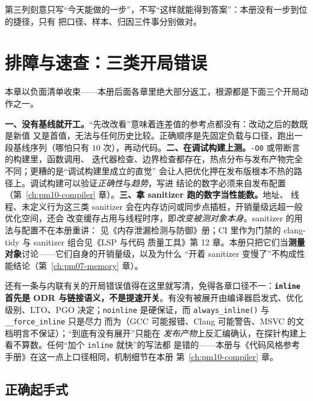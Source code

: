 \documentclass[12pt,a4paper,fontset=fandol]{ctexbook}
\newcommand{\Fn}[1]{\texttt{#1()}}
\newcommand{\Tp}[1]{\texttt{#1}}
\begin{document}
第三列刻意只写``今天能做的一步''，不写``这样就能得到答案''：本册没有一步到位的捷径，只有
把口径、样本、归因三件事分别做对。

\section{排障与速查：三类开局错误}
\label{sec:pm01-trouble}

本章以负面清单收束——本册后面各章里绝大部分返工，根源都是下面三个开局动作之一。

\begin{warning}[title={三类一开工就把结论作废的做法}]
\small
\textbf{一、没有基线就开工。}``先改改看''意味着连差值的参考点都没有：改动之后的数既是新值
又是首值，无法与任何历史比较。正确顺序是先固定负载与口径，跑出一段基线序列（哪怕只有
$10$ 次），再动代码。\textbf{二、在调试构建上测。}\Tp{-O0} 或带断言的构建里，函数调用、
迭代器检查、边界检查都存在，热点分布与发布产物完全不同；更糟的是``调试构建里成立的直觉''
会让人把优化押在发布版根本不热的路径上。调试构建可以验证\emph{正确性}与\emph{趋势}，写进
结论的数字必须来自发布配置（第~\ref{ch:pm10-compiler} 章）。\textbf{三、拿 sanitizer 跑的数字当性能数。}地址、
线程、未定义行为这三类 sanitizer 会在内存访问或同步点插桩，开销量级远超一般优化空间，还会
改变缓存占用与线程时序，即\emph{改变被测对象本身}。sanitizer 的用法与配置不在本册重讲：
见《内存泄漏检测与防御》册；CI 里作为门禁的 clang-tidy 与 sanitizer 组合见《LSP 与代码
质量工具》第 12 章。本册只把它们当\textbf{测量对象}讨论——它们自身的开销量级，以及为什么
``开着 sanitizer 变慢了''不构成性能结论（第~\ref{ch:pm07-memory} 章）。
\end{warning}

还有一条与内联有关的开局错误值得在这里就写清，免得各章口径不一：\textbf{\Tp{inline}
首先是 ODR 与链接语义，不是提速开关}。有没有被展开由编译器启发式、优化级别、LTO、PGO
决定；\Tp{noinline} 是硬保证，而 \Fn{always\_inline} 与 \Tp{\_\_force\_inline} 只是尽力
而为（GCC 可能报错、Clang 可能警告、MSVC 的文档明言不保证）；``到底有没有展开''只能在
\emph{发布产物}上反汇编确认，在探针构建上看不算数。任何``加个 \Tp{inline} 就快''的写法都
是错的——本册与《代码风格参考手册》在这一点上口径相同，机制细节在本册
第~\ref{ch:pm10-compiler} 章。

\subsection{正确起手式}
\label{sub:pm01-open}
\end{document}
